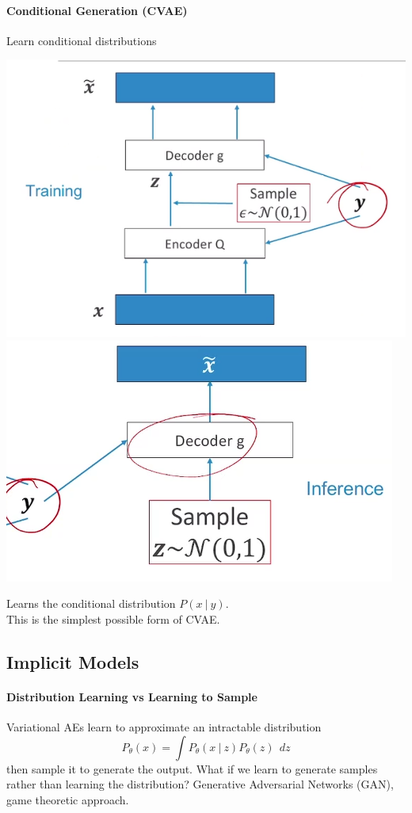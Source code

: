 \documentclass[10pt]{report}
\begin{document}
\paragraph{Conditional Generation (CVAE)} Learn conditional distributions\begin{center}
	\includegraphics[scale=0.5]{146.png}\\
	\includegraphics[scale=0.5]{147.png}
\end{center}
Learns the conditional distribution $P(x\:|\:y)$.\\
This is the simplest possible form of CVAE.
\subsection{Implicit Models}
\paragraph{Distribution Learning vs Learning to Sample} Variational AEs  learn to approximate an intractable distribution
$$P_\theta(x) = \int P_\theta(x\:|\:z)P_\theta(z)\:\:dz$$
then sample it to generate the output. What if we learn to generate samples rather than learning the distribution? Generative Adversarial Networks (GAN), game theoretic approach.
\end{document}

